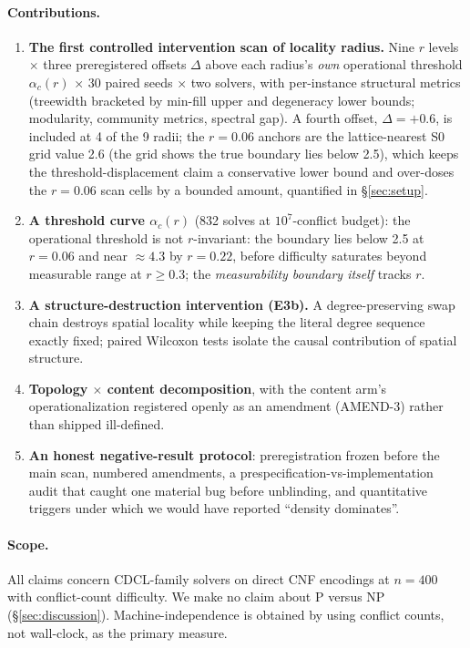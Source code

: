 \documentclass[manuscript, screen, review]{jair}
\newcommand{\ac}[1]{\ensuremath{\alpha_c(#1)}}
\begin{document}
\paragraph{Contributions.}
\begin{enumerate}
\item \textbf{The first controlled intervention scan of locality radius.}
Nine $r$ levels $\times$ three preregistered offsets $\Delta$ above each radius's
\emph{own} operational threshold $\ac{r}$ $\times$ 30 paired seeds $\times$ two
solvers, with per-instance structural metrics (treewidth bracketed by min-fill
upper and degeneracy lower bounds; modularity, community metrics, spectral
gap). A fourth offset, $\Delta{=}{+}0.6$, is included at 4 of the 9 radii; the
$r{=}0.06$ anchors are the lattice-nearest S0 grid value 2.6 (the grid shows
the true boundary lies below 2.5), which keeps the threshold-displacement
claim a conservative lower bound and over-doses the $r{=}0.06$ scan cells by
a bounded amount, quantified in \S\ref{sec:setup}.
\item \textbf{A threshold curve $\ac{r}$} (832 solves at $10^7$-conflict
budget): the operational threshold is not $r$-invariant: the boundary lies below
2.5 at $r=0.06$ and near ${\approx}4.3$ by $r=0.22$, before difficulty
saturates beyond measurable range at $r\ge0.3$; the \emph{measurability
boundary itself} tracks $r$.
\item \textbf{A structure-destruction intervention (E3b).} A degree-preserving
swap chain destroys spatial locality while keeping the literal degree sequence
exactly fixed; paired Wilcoxon tests isolate the causal contribution of
spatial structure.
\item \textbf{Topology $\times$ content decomposition}, with the content arm's
operationalization registered openly as an amendment (AMEND-3) rather than
shipped ill-defined.
\item \textbf{An honest negative-result protocol}: preregistration frozen
before the main scan, numbered amendments, a prespecification-vs-implementation
audit that caught one material bug before unblinding, and quantitative
triggers under which we would have reported ``density dominates''.
\end{enumerate}

\paragraph{Scope.}
All claims concern CDCL-family solvers on direct CNF encodings at $n=400$ with
conflict-count difficulty. We make no claim about \textsc{P} versus
\textsc{NP} (\S\ref{sec:discussion}). Machine-independence is obtained by
using conflict counts, not wall-clock, as the primary measure.
\end{document}

